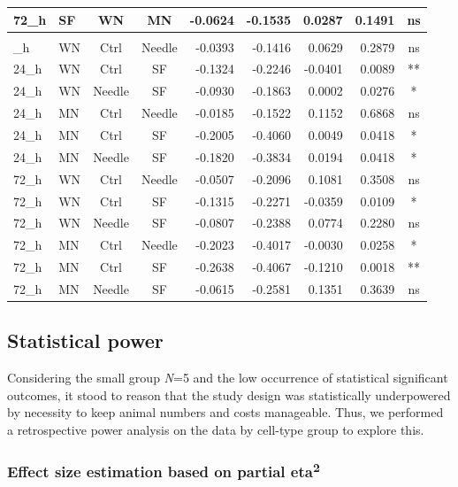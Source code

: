\documentclass[
  12pt,
  letterpaper,
]{article}
\begin{document}
\begin{longtable}{llccrrrrc}
72\_h & SF & WN & MN & -0.0624 & -0.1535 & 0.0287 & 0.1491 & ns \\ 
\midrule\addlinespace[2.5pt]
\multicolumn{9}{l}{Predictor: Route} \\[2.5pt] 
\midrule\addlinespace[2.5pt]
24\_h & WN & Ctrl & Needle & -0.0393 & -0.1416 & 0.0629 & 0.2879 & ns \\ 
24\_h & WN & Ctrl & SF & -0.1324 & -0.2246 & -0.0401 & 0.0089 & ** \\ 
24\_h & WN & Needle & SF & -0.0930 & -0.1863 & 0.0002 & 0.0276 & * \\ 
24\_h & MN & Ctrl & Needle & -0.0185 & -0.1522 & 0.1152 & 0.6868 & ns \\ 
24\_h & MN & Ctrl & SF & -0.2005 & -0.4060 & 0.0049 & 0.0418 & * \\ 
24\_h & MN & Needle & SF & -0.1820 & -0.3834 & 0.0194 & 0.0418 & * \\ 
72\_h & WN & Ctrl & Needle & -0.0507 & -0.2096 & 0.1081 & 0.3508 & ns \\ 
72\_h & WN & Ctrl & SF & -0.1315 & -0.2271 & -0.0359 & 0.0109 & * \\ 
72\_h & WN & Needle & SF & -0.0807 & -0.2388 & 0.0774 & 0.2280 & ns \\ 
72\_h & MN & Ctrl & Needle & -0.2023 & -0.4017 & -0.0030 & 0.0258 & * \\ 
72\_h & MN & Ctrl & SF & -0.2638 & -0.4067 & -0.1210 & 0.0018 & ** \\ 
72\_h & MN & Needle & SF & -0.0615 & -0.2581 & 0.1351 & 0.3639 & ns \\ 
\bottomrule
\end{longtable}
\endgroup

\subsection{Statistical power}\label{statistical-power}

Considering the small group \emph{N}=5 and the low occurrence of statistical significant outcomes, it stood to reason that the study design was statistically underpowered by necessity to keep animal numbers and costs manageable. Thus, we performed a retrospective power analysis on the data by cell-type group to explore this.

\subsubsection{\texorpdfstring{Effect size estimation based on partial eta\textsuperscript{2}}{Effect size estimation based on partial eta2}}\label{effect-size-estimation-based-on-partial-eta2}
\end{document}
